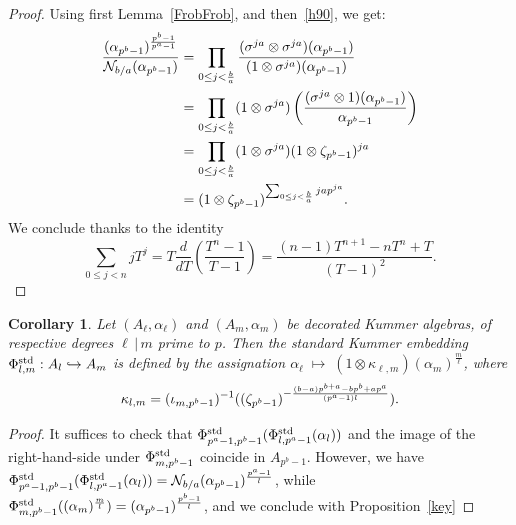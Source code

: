 \documentclass[sigconf]{acmart}
\newtheorem{corollary}[theorem]{Corollary}
\begin{document}
\begin{proof}
Using first Lemma~\ref{FrobFrob}, and then~\eqref{h90}, we get:
\begin{equation*}
\begin{split}
\frac{(\alpha_{p^b-1})^{\frac{p^b-1}{p^a-1}}}{\mathcal{N}_{b/a}(\alpha_{p^b-1})}&=\prod_{0\leq j<\frac{b}{a}}\frac{(\sigma^{ja}\otimes\sigma^{ja})(\alpha_{p^b-1})}{(1\otimes\sigma^{ja})(\alpha_{p^b-1})}\\
&=\prod_{0\leq j<\frac{b}{a}}(1\otimes\sigma^{ja})\left(\frac{(\sigma^{ja}\otimes 1)(\alpha_{p^b-1})}{\alpha_{p^b-1}}\right)\\
&=\prod_{0\leq j<\frac{b}{a}}(1\otimes\sigma^{ja})(1\otimes\zeta_{p^b-1})^{ja}\\
&=(1\otimes\zeta_{p^b-1})^{\sum_{0\leq j<\frac{b}{a}}jap^{ja}}.
\end{split}
\end{equation*}
We conclude thanks to the identity
\[ \sum_{0\leq j<n}jT^j=T\frac{d}{dT}\!\left(\frac{T^n-1}{T-1}\right)=\frac{(n-1)T^{n+1}-nT^n+T}{(T-1)^2}. \]
\end{proof}
\begin{corollary}
\label{explicit_general_standard_embedding}
Let $(A_\ell,\alpha_\ell)$ and $(A_m,\alpha_m)$ be decorated Kummer algebras,
of respective degrees $\ell\,|\,m$ prime to $p$.
Then the standard Kummer embedding ${\Phi^{\mathrm{std}}_{{l},{m}}}:A_l\hookrightarrow A_m$
is defined by the assignation
$\alpha_\ell\;\mapsto\;(1\otimes\kappa_{\ell,m})(\alpha_m)^{\frac{m}{\ell}}$, where
\[
  \kappa_{l,m}=({\iota_{{m},{p^b-1}}})^{-1}((\zeta_{p^b-1})^{-\frac{(b-a)p^{b+a}-bp^b+ap^a}{(p^a-1)l}}).
\]
\end{corollary}
\begin{proof}
It suffices to check that ${\Phi^{\mathrm{std}}_{{p^a-1},{p^b-1}}}({\Phi^{\mathrm{std}}_{{l},{p^a-1}}}(\alpha_l))$
and the image of the right-hand-side under ${\Phi^{\mathrm{std}}_{{m},{p^b-1}}}$ coincide in $A_{p^b-1}$.
However, we have ${\Phi^{\mathrm{std}}_{{p^a-1},{p^b-1}}}({\Phi^{\mathrm{std}}_{{l},{p^a-1}}}(\alpha_l))=\mathcal{N}_{b/a}(\alpha_{p^b-1})^{\frac{p^a-1}{l}}$,
while ${\Phi^{\mathrm{std}}_{{m},{p^b-1}}}((\alpha_m)^{\frac{m}{l}})=(\alpha_{p^b-1})^{\frac{p^b-1}{l}}$,
and we conclude with Proposition~\ref{key}
\end{proof}
\end{document}
